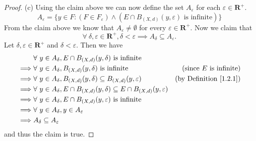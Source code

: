 \begin{proof}{(c)}
    Using the claim above we can now define the set \(A_\varepsilon\) for each \(\varepsilon \in \mathbf{R}^+\).
    \[
        A_\varepsilon = \big\{y \in F : (F \in F_\varepsilon) \land (E \cap B_{(X, d)}(y, \varepsilon) \text{ is infinite})\big\}
    \]
    From the claim above we know that \(A_\varepsilon \neq \emptyset\) for every \(\varepsilon \in \mathbf{R}^+\).
    Now we claim that
    \[
        \forall\ \delta, \varepsilon \in \mathbf{R}^+, \delta < \varepsilon \implies A_\delta \subseteq A_\varepsilon.
    \]
    Let \(\delta, \varepsilon \in \mathbf{R}^+\) and \(\delta < \varepsilon\).
    Then we have
    \begin{align*}
                 & \forall\ y \in A_\delta, E \cap B_{(X, d)}(y, \delta) \text{ is infinite}                                                              \\
        \implies & \forall\ y \in A_\delta, B_{(X, d)}(y, \delta) \text{ is infinite}                                & \text{(since \(E\) is infinite)}   \\
        \implies & \forall\ y \in A_\delta, B_{(X, d)}(y, \delta) \subseteq B_{(X, d)}(y, \varepsilon)               & \text{(by Definition \ref{1.2.1})} \\
        \implies & \forall\ y \in A_\delta, E \cap B_{(X, d)}(y, \delta) \subseteq E \cap B_{(X, d)}(y, \varepsilon)                                      \\
        \implies & \forall\ y \in A_\delta, E \cap B_{(X, d)}(y, \varepsilon) \text{ is infinite}                                                         \\
        \implies & \forall\ y \in A_\delta, y \in A_\varepsilon                                                                                           \\
        \implies & A_\delta \subseteq A_\varepsilon
    \end{align*}
    and thus the claim is true.


\end{proof}
